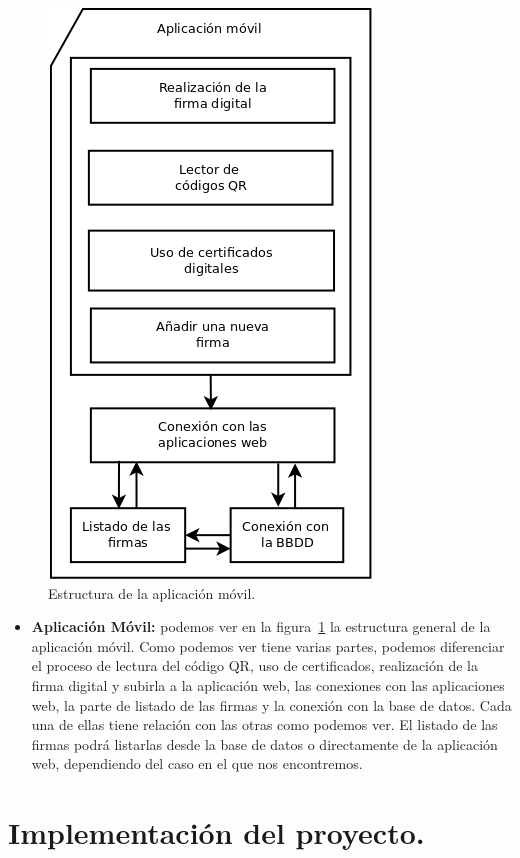 \begin{figure}
  \centering
    \includegraphics[scale=0.3]{./DisenhoYArquitectura/imagenes/aplicacionMovil.png}
  \caption{Estructura de la aplicación móvil.}
  \label{fig:aplicacionMovil}
\end{figure}

\begin{itemize}
\item \textbf{Aplicación Móvil:} podemos ver en la figura~\ref{fig:aplicacionMovil} la estructura general de la aplicación móvil. Como podemos ver tiene varias partes, podemos diferenciar el proceso de lectura del código QR, uso de certificados, realización de la firma digital y subirla a la aplicación web, las conexiones con las aplicaciones web, la parte de listado de las firmas y la conexión con la base de datos. Cada una de ellas tiene relación con las otras como podemos ver. El listado de las firmas podrá listarlas desde la base de datos o directamente de la aplicación web, dependiendo del caso en el que nos encontremos.
\end{itemize}

\section{Implementación del proyecto.}

